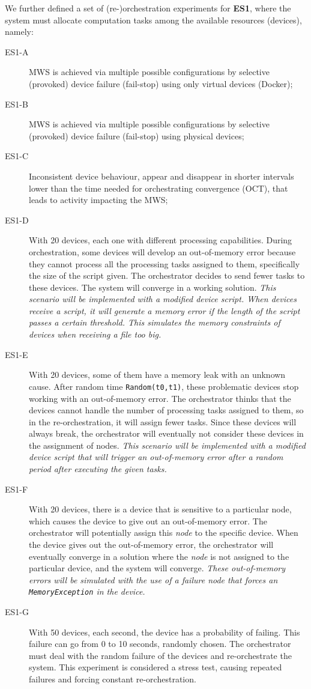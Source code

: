 We further defined a set of (re-)orchestration experiments for \textbf{ES1}, where the system must allocate computation tasks among the available resources (\ie devices), namely:
\begin{description}
    \item[ES1-A] MWS is achieved via multiple possible configurations by selective (provoked) device failure (fail-stop) using only virtual devices (\ie Docker);
    \item[ES1-B] MWS is achieved via multiple possible configurations by selective (provoked) device failure (fail-stop) using physical devices;
    \item[ES1-C] Inconsistent device behaviour, \eg appear and disappear in shorter intervals lower than the time needed for orchestrating convergence (OCT), that leads to activity impacting the MWS;
    \item[ES1-D] With 20 devices, each one with different processing capabilities. During orchestration, some devices will develop an out-of-memory error because they cannot process all the processing tasks assigned to them, specifically the size of the script given. The orchestrator decides to send fewer tasks to these devices. The system will converge in a working solution. \textit{This scenario will be implemented with a modified device script. When devices receive a script, it will generate a memory error if the length of the script passes a certain threshold. This simulates the memory constraints of devices when receiving a file too big.}
    \item[ES1-E] With 20 devices, some of them have a memory leak with an unknown cause. After random time \texttt{Random(t0,t1)}, these problematic devices stop working with an out-of-memory error. The orchestrator thinks that the devices cannot handle the number of processing tasks assigned to them, so in the re-orchestration, it will assign fewer tasks. Since these devices will always break, the orchestrator will eventually not consider these devices in the assignment of nodes. \textit{This scenario will be implemented with a modified device script that will trigger an out-of-memory error after a random period after executing the given tasks.}
    \item[ES1-F] With 20 devices, there is a device that is sensitive to a particular node, which causes the device to give out an out-of-memory error. The orchestrator will potentially assign this \textit{node} to the specific device. When the device gives out the out-of-memory error, the orchestrator will eventually converge in a solution where the \textit{node} is not assigned to the particular device, and the system will converge.  \textit{These out-of-memory errors will be simulated with the use of a failure \textit{node} that forces an \texttt{MemoryException} in the device.}
    \item[ES1-G] With 50 devices, each second, the device has a probability of failing. This failure can go from 0 to 10 seconds, randomly chosen. The orchestrator must deal with the random failure of the devices and re-orchestrate the system. This experiment is considered a stress test, causing repeated failures and forcing constant re-orchestration.
\end{description}

